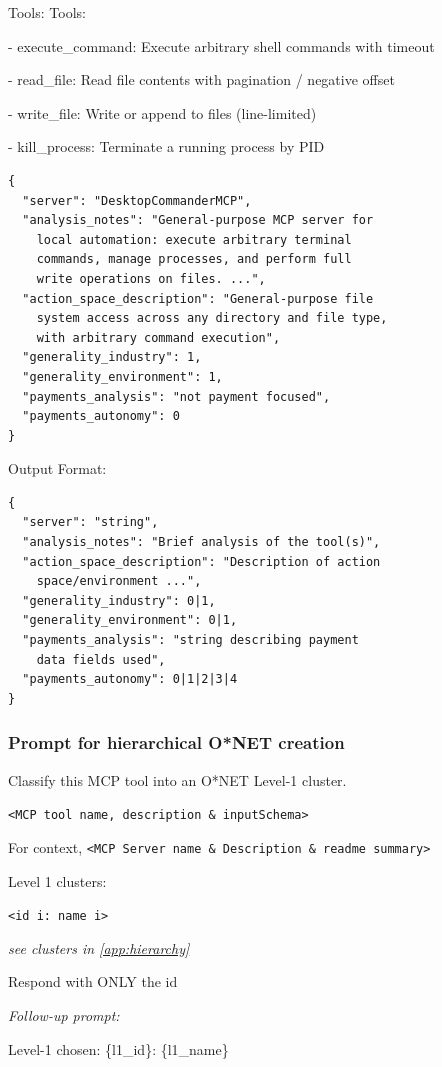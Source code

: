 \documentclass[manuscript,screen,nonacm,oneside]{acmart}
\begin{document}
Tools: Tools:

- execute\_command: Execute arbitrary shell commands with timeout

- read\_file: Read file contents with pagination / negative offset

- write\_file: Write or append to files (line-limited)

- kill\_process: Terminate a running process by PID

\begin{lstlisting}
{
  "server": "DesktopCommanderMCP",
  "analysis_notes": "General-purpose MCP server for
    local automation: execute arbitrary terminal
    commands, manage processes, and perform full
    write operations on files. ...",
  "action_space_description": "General-purpose file
    system access across any directory and file type,
    with arbitrary command execution",
  "generality_industry": 1,
  "generality_environment": 1,
  "payments_analysis": "not payment focused",
  "payments_autonomy": 0
}
\end{lstlisting}

Output Format:

\begin{lstlisting}
{
  "server": "string",
  "analysis_notes": "Brief analysis of the tool(s)",
  "action_space_description": "Description of action
    space/environment ...",
  "generality_industry": 0|1,
  "generality_environment": 0|1,
  "payments_analysis": "string describing payment
    data fields used",
  "payments_autonomy": 0|1|2|3|4
}
\end{lstlisting}

\subsubsection{Prompt for hierarchical O*NET creation}
\label{app:onet-prompt}

Classify this MCP tool into an O*NET Level-1 cluster.

\texttt{<MCP tool name, description \& inputSchema>} 

For context, \texttt{<MCP Server name \& Description \& readme summary>}

Level 1 clusters:

\texttt{<id i: name i>}

\textit{see clusters in \ref{app:hierarchy}}

Respond with ONLY the id

\textit{Follow-up prompt:}

Level-1 chosen: \{l1\_id\}: \{l1\_name\}
\end{document}
